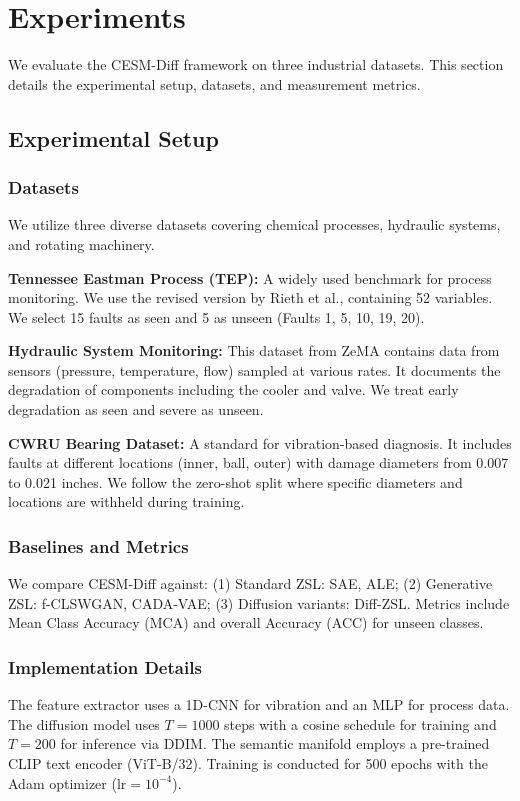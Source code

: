 \section{Experiments}
\label{sec:experiments}

We evaluate the CESM-Diff framework on three industrial datasets. This section details the experimental setup, datasets, and measurement metrics.

\subsection{Experimental Setup}
\subsubsection{Datasets}
We utilize three diverse datasets covering chemical processes, hydraulic systems, and rotating machinery.

\textbf{Tennessee Eastman Process (TEP):} A widely used benchmark for process monitoring. We use the revised version by Rieth et al., containing 52 variables. We select 15 faults as seen and 5 as unseen (Faults 1, 5, 10, 19, 20).

\textbf{Hydraulic System Monitoring:} This dataset from ZeMA contains data from sensors (pressure, temperature, flow) sampled at various rates. It documents the degradation of components including the cooler and valve. We treat early degradation as seen and severe as unseen.

\textbf{CWRU Bearing Dataset:} A standard for vibration-based diagnosis. It includes faults at different locations (inner, ball, outer) with damage diameters from 0.007 to 0.021 inches. We follow the zero-shot split where specific diameters and locations are withheld during training.

\subsubsection{Baselines and Metrics}
We compare CESM-Diff against: (1) Standard ZSL: SAE, ALE; (2) Generative ZSL: f-CLSWGAN, CADA-VAE; (3) Diffusion variants: Diff-ZSL. Metrics include Mean Class Accuracy (MCA) and overall Accuracy (ACC) for unseen classes.

\subsubsection{Implementation Details}
The feature extractor uses a 1D-CNN for vibration and an MLP for process data. The diffusion model uses $T=1000$ steps with a cosine schedule for training and $T=200$ for inference via DDIM. The semantic manifold employs a pre-trained CLIP text encoder (ViT-B/32). Training is conducted for 500 epochs with the Adam optimizer ($\text{lr}=10^{-4}$).

